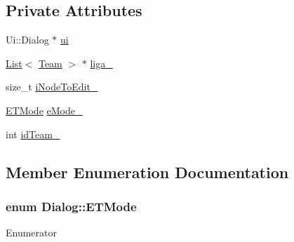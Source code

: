 \subsection*{Private Attributes}
\begin{DoxyCompactItemize}
\item 
Ui\+::\+Dialog $\ast$ \hyperlink{class_dialog_aaa4b5bfb9a0f64900d524f14bc32e6df}{ui}
\item 
\hyperlink{class_list}{List}$<$ \hyperlink{class_team}{Team} $>$ $\ast$ \hyperlink{class_dialog_a91cdee063ecd915858353d07f2e50eb2}{liga\+\_\+}
\item 
size\+\_\+t \hyperlink{class_dialog_a77bd4ac2499af67029f8f00d682ffde9}{i\+Node\+To\+Edit\+\_\+}
\item 
\hyperlink{class_dialog_ae78164fb050172481b9bc05bdbbdc9b0}{E\+T\+Mode} \hyperlink{class_dialog_a99d3ef596f183ccf2d69c3b465989102}{e\+Mode\+\_\+}
\item 
int \hyperlink{class_dialog_af05db46d671e032a4e51e4068f32fb06}{id\+Team\+\_\+}
\end{DoxyCompactItemize}


\subsection{Member Enumeration Documentation}
\hypertarget{class_dialog_ae78164fb050172481b9bc05bdbbdc9b0}{}
\subsubsection[{E\+T\+Mode}]{\setlength{\rightskip}{0pt plus 5cm}enum {\bf Dialog\+::\+E\+T\+Mode}}\label{class_dialog_ae78164fb050172481b9bc05bdbbdc9b0}
\begin{Desc}
\item[Enumerator]\par
\begin{description}
\item[{\em 
\hypertarget{class_dialog_ae78164fb050172481b9bc05bdbbdc9b0a382169df655aea6ae97508c2cbba7d3e}{}A\+D\+D\label{class_dialog_ae78164fb050172481b9bc05bdbbdc9b0a382169df655aea6ae97508c2cbba7d3e}
}]\item[{\em 
\hypertarget{class_dialog_ae78164fb050172481b9bc05bdbbdc9b0a89d44aa4439f5e2be5a9e99935813385}{}E\+D\+I\+T\label{class_dialog_ae78164fb050172481b9bc05bdbbdc9b0a89d44aa4439f5e2be5a9e99935813385}
}]\item[{\em 
\hypertarget{class_dialog_ae78164fb050172481b9bc05bdbbdc9b0a3ee13ecddf383e1872ad53f5f1947ef1}{}S\+E\+A\+R\+C\+H\label{class_dialog_ae78164fb050172481b9bc05bdbbdc9b0a3ee13ecddf383e1872ad53f5f1947ef1}
}]\end{description}
\end{Desc}


